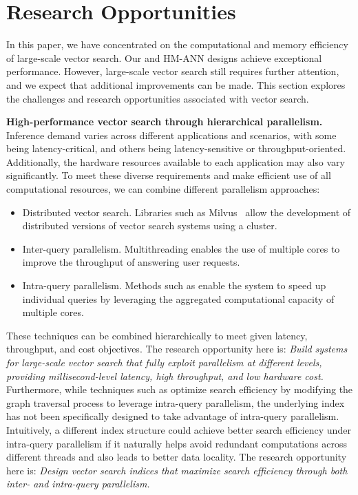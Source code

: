 \section{Research Opportunities}
\label{minjia_sec:future}

In this paper, we have concentrated on the computational and memory efficiency of large-scale vector search. Our \Hammer and HM-ANN designs achieve exceptional performance. However, large-scale vector search still requires further attention, and we expect that additional improvements can be made. This section explores the challenges and research opportunities associated with vector search.

\textbf{High-performance vector search through hierarchical parallelism.} Inference demand varies across different applications and scenarios, with some being latency-critical, and others being latency-sensitive or throughput-oriented. Additionally, the hardware resources available to each application may also vary significantly. To meet these diverse requirements and make efficient use of all computational resources, we can combine different parallelism approaches:
\begin{itemize}
    \item Distributed vector search. Libraries such as Milvus~\cite{milvus} allow the development of distributed versions of vector search systems using a cluster.
    \item Inter-query parallelism. Multithreading enables the use of multiple cores to improve the throughput of answering user requests.
    \item Intra-query parallelism. Methods such as \Hammer enable the system to speed up individual queries by leveraging the aggregated computational capacity of multiple cores.
\end{itemize}

These techniques can be combined hierarchically to meet given latency, throughput, and cost objectives. The research opportunity here is: \emph{Build systems for large-scale vector search that fully exploit parallelism at different levels, providing millisecond-level latency, high throughput, and low hardware cost.}
Furthermore, while techniques such as \Hammer optimize search efficiency by modifying the graph traversal process to leverage intra-query parallelism, the underlying index has not been specifically designed to take advantage of intra-query parallelism. Intuitively, a different index structure could achieve better search efficiency under intra-query parallelism if it naturally helps avoid redundant computations across different threads and also leads to better data locality. The research opportunity here is: \emph{Design vector search indices that maximize search efficiency through both inter- and intra-query parallelism. } 

